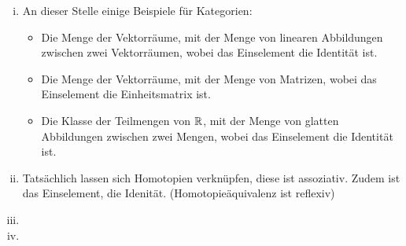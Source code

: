 \documentclass{scrartcl}
\begin{document}
\begin{aufgabe}
\begin{enumerate}[(i)]
\item An dieser Stelle einige Beispiele für Kategorien:
\begin{itemize}
\item Die Menge der Vektorräume, mit der Menge von linearen Abbildungen zwischen zwei Vektorräumen, wobei das Einselement die Identität ist.
\item Die Menge der Vektorräume, mit der Menge von Matrizen, wobei das Einselement die Einheitsmatrix ist.
\item Die Klasse der Teilmengen von $ \mathbb{R} $, mit der Menge von glatten Abbildungen zwischen zwei Mengen, wobei das Einselement die Identität ist. 
\end{itemize}
\item Tatsächlich lassen sich Homotopien verknüpfen, diese ist assoziativ. Zudem ist das Einselement, die Idenität. (Homotopieäquivalenz ist reflexiv)
\item {}
\item {}
\end{enumerate}  
\end{aufgabe}
\end{document}
